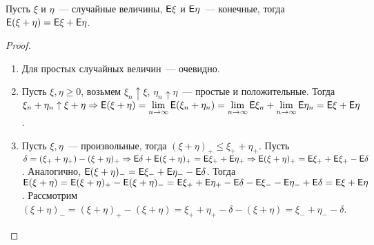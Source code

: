 \begin{property}[Аддитивность]
	Пусть $\xi$ и $\eta$~--- случайные величины, $\mathsf{E}\xi$ и $\mathsf{E}\eta$~--- конечные, тогда $\mathsf{E}(\xi + \eta) = \mathsf{E}\xi + \mathsf{E}\eta$.
	\begin{proof}
	    \begin{enumerate}
    	    \item Для простых случайных величин~--- очевидно. 
    	    
    	    \item Пусть $\xi, \eta \geqslant 0$, возьмем $\xi_n \uparrow \xi$, $\eta_n \uparrow \eta$~--- простые и положительные. Тогда $\xi_n + \eta_n \uparrow \xi + \eta \Rightarrow \mathsf{E}(\xi + \eta) = \lim\limits_{n \rightarrow \infty}\mathsf{E}(\xi_n + \eta_n) = \lim\limits_{n \rightarrow \infty}\mathsf{E} \xi_n + \lim\limits_{n \rightarrow \infty} \mathsf{E}\eta_n = \mathsf{E}\xi + \mathsf{E}\eta$. 
    	    
    	    \item Пусть $\xi, \eta$~--- произвольные, тогда $(\xi + \eta)_+ \leqslant \xi_+ + \eta_+$. Пусть $\delta = (\xi_+ + \eta_+) - (\xi + \eta)_+ \Rightarrow \mathsf{E}\delta + \mathsf{E}(\xi + \eta)_+ = \mathsf{E}\xi_+ + \mathsf{E}\eta_+ \Rightarrow \mathsf{E}(\xi + \eta)_+ = \mathsf{E}\xi_+ + \mathsf{E}\xi_+ - \mathsf{E}\delta$. Аналогично, $\mathsf{E}(\xi + \eta)_- = \mathsf{E}\xi_- + \mathsf{E}\eta_- - \mathsf{E}\delta$. Тогда $\mathsf{E}(\xi + \eta) = \mathsf{E}(\xi + \eta)_+ - \mathsf{E}(\xi + \eta)_- = \mathsf{E}\xi_+ + \mathsf{E}\eta_+ - \mathsf{E}\delta - \mathsf{E}\xi_- - \mathsf{E}\eta_- + \mathsf{E} \delta = \mathsf{E}\xi + \mathsf{E}\eta$. Рассмотрим $(\xi + \eta)_- = (\xi + \eta)_+ - (\xi + \eta) = \xi_+ + \eta_+ - \delta - (\xi + \eta) = \xi_- + \eta_- - \delta$.
	    \end{enumerate}
	\end{proof}
\end{property}

